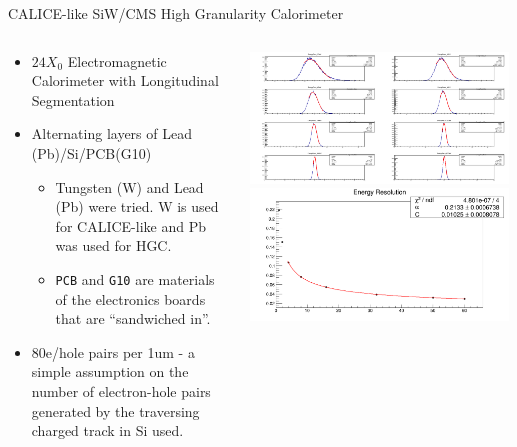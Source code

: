 \documentclass[pdf, 9pt]{beamer}
\begin{document}
  \begin{frame}{CALICE-like SiW/CMS High Granularity Calorimeter}
    \begin{columns}[T]
      \begin{column}{0.6\textwidth}
        \begin{itemize}
          \item $24X_{0}$ Electromagnetic Calorimeter with \alert{Longitudinal Segmentation}
          \item Alternating layers of Lead (Pb)/Si/PCB(G10)
            \begin{itemize}
              \item Tungsten (W) and Lead (Pb) were tried. W is used for CALICE-like and Pb was used for HGC.
              \item \texttt{PCB} and \texttt{G10} are materials of the electronics boards that are ``sandwiched in''.
            \end{itemize}
          \item 80e/hole pairs per 1um - a simple assumption on the number of electron-hole pairs generated by the traversing charged track in Si used.
        \end{itemize}
      \end{column}
      \begin{column}{0.4\textwidth}
        \includegraphics[width=0.99\textwidth, height=0.4\textheight]{figs/hgcal_smallscale/Pb/EnergyRECO.png}\\
        \includegraphics[width=0.99\textwidth, height=0.4\textheight]{figs/hgcal_smallscale/Pb/Resolution.png}
      \end{column}
    \end{columns}
  \end{frame}
\end{document}
